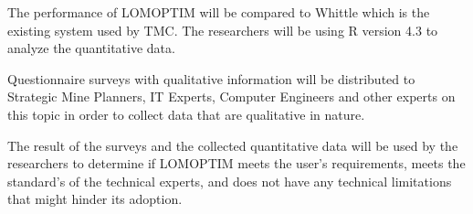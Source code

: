 \documentclass[12pt]{report}
\begin{document}
The performance of LOMOPTIM will be compared to Whittle which is the existing system used by TMC.
The researchers will be using R version 4.3 \cite{R} to analyze the quantitative data.

Questionnaire surveys with qualitative information will be distributed to Strategic Mine Planners, IT Experts, Computer Engineers and other experts on this topic in order to collect data that are qualitative in nature.

The result of the surveys and the collected quantitative data will be used by the researchers to determine if LOMOPTIM meets the user's requirements, meets the standard's of the technical experts, and does not have any technical limitations that might hinder its adoption.


\printbibliography[
    title = {REFERENCES},
    heading = bibintoc
]

\setlength{\parindent}{0mm}
\end{document}
